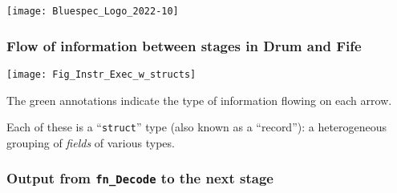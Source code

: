 



\date{L5: {\BSV} Structs; Memory requests and responses}





\begin{frame}
 \titlepage

 \begin{center}
  \texttt{[image: Bluespec\_Logo\_2022-10]}
 \end{center}

\end{frame}





\begin{frame}
\frametitle{Flow of information between stages in Drum and Fife}

\footnotesize

\begin{center}
\texttt{[image: Fig\_Instr\_Exec\_w\_structs]}
\end{center}

\vspace*{2ex}

The green annotations indicate the type of information flowing on each arrow.

Each of these is a ``{\tt struct}'' type (also known as a ``record''):
a heterogeneous grouping of \emph{fields} of various types.

\end{frame}


\begin{frame}
\frametitle{Output from {\tt fn\_Decode} to the next stage}

\footnotesize


\end{frame}

